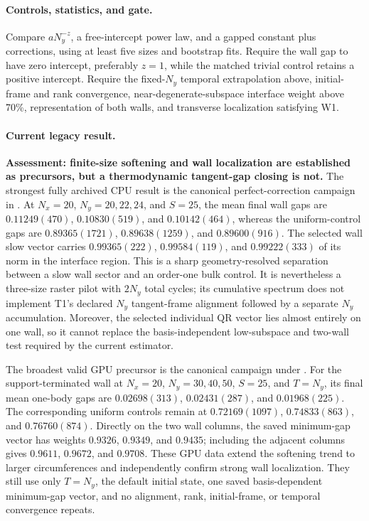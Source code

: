 \documentclass[aps,prx,twocolumn,floatfix,nofootinbib,superscriptaddress,longbibliography]{revtex4-2}
\begin{document}
\paragraph*{Controls, statistics, and gate.}
Compare $aN_y^{-z}$, a free-intercept power law, and a gapped constant plus corrections,
using at least five sizes and bootstrap fits.  Require the wall gap to have zero intercept,
preferably $z=1$, while the matched trivial control retains a positive intercept.  Require
the fixed-$N_y$ temporal extrapolation above, initial-frame and rank convergence,
near-degenerate-subspace interface weight above 70\%, representation of both walls, and
transverse localization satisfying W1.

\paragraph*{Current legacy result.}
\textbf{Assessment: finite-size softening and wall localization are established as
precursors, but a thermodynamic tangent-gap closing is not.}
The strongest fully archived CPU result is the canonical perfect-correction campaign in
.  At $N_x=20$, $N_y=20,22,24$, and $S=25$,
the mean final wall gaps are $0.11249(470)$, $0.10830(519)$, and $0.10142(464)$, whereas
the uniform-control gaps are $0.89365(1721)$, $0.89638(1259)$, and $0.89600(916)$.  The
selected wall slow vector carries $0.99365(222)$, $0.99584(119)$, and $0.99222(333)$ of
its norm in the interface region.  This is a sharp geometry-resolved separation between a
slow wall sector and an order-one bulk control.  It is nevertheless a three-size raster
pilot with $2N_y$ total cycles; its cumulative spectrum does not implement T1's declared
$N_y$ tangent-frame alignment followed by a separate $N_y$ accumulation.  Moreover, the
selected individual QR vector lies
almost entirely on one wall, so it cannot replace the basis-independent low-subspace and
two-wall test required by the current estimator.

The broadest valid GPU precursor is the canonical campaign under
.  For the support-terminated wall at $N_x=20$,
$N_y=30,40,50$, $S=25$, and $T=N_y$, its final mean one-body gaps are
$0.02698(313)$, $0.02431(287)$, and $0.01968(225)$.  The corresponding uniform controls
remain at $0.72169(1097)$, $0.74833(863)$, and $0.76760(874)$.  Directly on the two wall
columns, the saved minimum-gap vector has weights $0.9326$, $0.9349$, and $0.9435$;
including the adjacent columns gives $0.9611$, $0.9672$, and $0.9708$.  These GPU data
extend the softening trend to larger circumferences and independently confirm strong wall
localization.  They still use only $T=N_y$, the default initial state, one saved
basis-dependent minimum-gap vector, and no alignment, rank, initial-frame, or temporal
convergence repeats.
\end{document}
